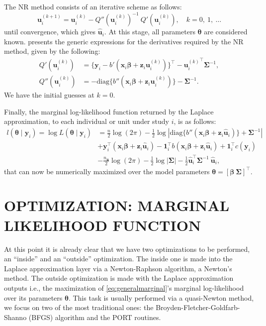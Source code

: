 The NR method consists of an iterative scheme as follows:
\[
 \bm{u}_{i}^{(k+1)} =
 \bm{u}_{i}^{(k)} - {Q}''(\bm{u}_{i}^{(k)})^{-1}~{Q}'(\bm{u}_{i}^{(k)}),
 \quad k = 0,~1,~\dots
\]
until convergence, which gives \(\bm{\hat{u}}_{i}\). At this stage, all
parameters \(\bm{\theta}\) are considered known. 
presents the generic expressions for the derivatives required by the NR
method, given by the following:
\begin{equation}
 \begin{aligned}
  {Q}'(\bm{u}_{i}^{(k)}) &=
  \{\bm{y}_{i} - {b}'(\bm{x}_{i}\bm{\beta} + \bm{z}_{i}\bm{u}_{i}^{(k)})
  \}^{\top} - {\bm{u}_{i}^{(k)}}^{\top} \bm{\Sigma}^{-1},\\
  {Q}''(\bm{u}_{i}^{(k)}) &=
  - \text{diag}\{{b}''(\bm{x}_{i}\bm{\beta}
  + \bm{z}_{i}\bm{u}_{i}^{(k)})\} - \bm{\Sigma}^{-1}.
 \end{aligned}
 \nonumber
\end{equation}
We have the initial guesses at \(k = 0\).

Finally, the marginal log-likelihood function returned by the Laplace
approximation, to each individual or unit under study \(i\), is as
follows:
\begin{equation}
 \begin{aligned}
  l(\bm{\theta} \mid \bm{y}_{i}) =
  \log L(\bm{\theta} \mid \bm{y}_{i}) &= \frac{n}{2} \log (2\pi) -
  \frac{1}{2} \log
  \left| \text{diag}\{{b}''(\bm{x}_{i}\bm{\beta} +
                      \bm{z}_{i}\bm{\hat{u}}_{i})
                    \} + \bm{\Sigma}^{-1}
  \right|\\
  &+ \bm{y}_{i}^{\top}
     (\bm{x}_{i}\bm{\beta} + \bm{z}_{i}\bm{\hat{u}}_{i}) -
     \bm{1}_{i}^{\top}
     b(\bm{x}_{i}\bm{\beta} + \bm{z}_{i}\bm{\hat{u}}_{i}) +
     \bm{1}_{i}^{\top} c(\bm{y}_{i})\\
  &- \frac{n_{\bm{u}}}{2} \log (2\pi) -
     \frac{1}{2} \log |\bm{\Sigma}| - \frac{1}{2}
     \bm{\hat{u}}_{i}^{\top}\bm{\Sigma}^{-1}~\bm{\hat{u}}_{i},
 \end{aligned}
 \nonumber
\end{equation}
that can now be numerically maximized over the model parameters
\(\bm{\theta} = [\bm{\beta~\Sigma}]^{\top}\).

\section{OPTIMIZATION: MARGINAL LIKELIHOOD FUNCTION}
\label{cap:opt}

At this point it is already clear that we have two optimizations to be
performed, an ``inside'' and an ``outside'' optimization. The inside one
is made into the Laplace approximation layer via a Newton-Raphson
algorithm, a Newton's method. The outside optimization is made with the
Laplace approximation outputs i.e., the maximization of
\autoref{eq:generalmarginal}'s marginal log-likelihood over its
parameters \(\bm{\theta}\). This task is usually performed via a
quasi-Newton method, we focus on two of the most traditional ones: the
Broyden-Fletcher-Goldfarb-Shanno (BFGS) algorithm and the PORT routines.

